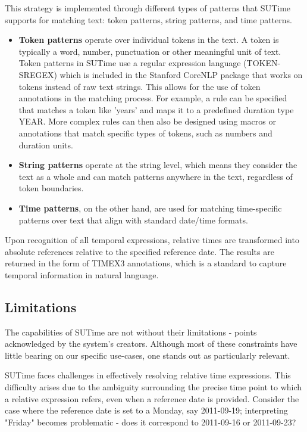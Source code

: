 \documentclass[a4paper,12pt]{report} %
\begin{document}
This strategy is implemented through different types of patterns that SUTime supports for matching text: token patterns, string patterns, and time patterns.

\begin{itemize}
  \item \textbf{Token patterns} operate over individual tokens in the text. A token is typically a word, number, punctuation or other meaningful unit of text. Token patterns in SUTime use a regular expression language (TOKEN-SREGEX) which is included in the Stanford CoreNLP package that works on tokens instead of raw text strings. This allows for the use of token annotations in the matching process. For example, a rule can be specified that matches a token like 'years' and maps it to a predefined duration type YEAR. More complex rules can then also be designed using macros or annotations that match specific types of tokens, such as numbers and duration units.

  \item \textbf{String patterns} operate at the string level, which means they consider the text as a whole and can match patterns anywhere in the text, regardless of token boundaries.

  \item \textbf{Time patterns}, on the other hand, are used for matching time-specific patterns over text that align with standard date/time formats.
\end{itemize}

Upon recognition of all temporal expressions, relative times are transformed into absolute references relative to the specified reference date. The results are returned in the form of TIMEX3 annotations, which is a standard to capture temporal information in natural language.

\subsection{Limitations}
The capabilities of SUTime are not without their limitations - points acknowledged by the system's creators. Although most of these constraints have little bearing on our specific use-cases, one stands out as particularly relevant.

SUTime faces challenges in effectively resolving relative time expressions. This difficulty arises due to the ambiguity surrounding the precise time point to which a relative expression refers, even when a reference date is provided. Consider the case where the reference date is set to a Monday, say 2011-09-19; interpreting "Friday" becomes problematic - does it correspond to 2011-09-16 or 2011-09-23?
\end{document}
